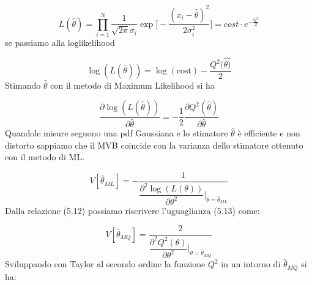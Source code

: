 \begin{equation*}
	L(\hat{\theta}) = \prod_{i=1}^N \dfrac{1}{\sqrt{2\pi}\sigma_i}\exp{\Big [-\frac{ (x_i-\hat{\theta})^2}{2 \sigma_i^2} \Big]} = cost \cdot e^{-\frac{Q^2}{2}}
\end{equation*}
se passiamo alla loglikelihood

\begin{equation*}
	\log(L(\hat{\theta})) = \log(\text{cost}) - \dfrac{Q^2(\hat{\theta)}}{2}
\end{equation*}
Stimando $\hat{\theta}$ con il metodo di Maximum Likelihood si ha

\begin{equation}
	\dfrac{\partial \log(L(\hat{\theta}))}{\partial \hat{\theta}} = - \dfrac{1}{2}\dfrac{\partial Q^2(\hat{\theta})}{\partial \hat{\theta}}
\end{equation}
Quandole misure seguono una pdf Gaussiana e lo stimatore $\hat{\theta}$ \`{e} efficiente e non distorto sappiamo che il MVB coincide con la varianza dello stimatore ottenuto con il metodo di ML.

\begin{equation}
	V[\hat{\theta}_{ML}] = - \dfrac{1}{\dfrac{\partial^2 \log(L(\theta))}{\partial \theta^2} \Big \vert_{\theta = \hat{\theta}_{ML}}} 
\end{equation}
Dalla relazione (5.12) possiamo riscrivere l'uguaglianza (5.13) come:

\begin{equation}
	V[\hat{\theta}_{MQ}] = \dfrac{2}{\dfrac{\partial^2Q^2(\theta)}{\partial \theta^2} \Big \vert_{\theta = \hat{\theta}_{MQ}}}
\end{equation}
Sviluppando con Taylor al secondo ordine la funzione $Q^2$ in un intorno di $\hat{\theta}_{MQ}$ si ha:

